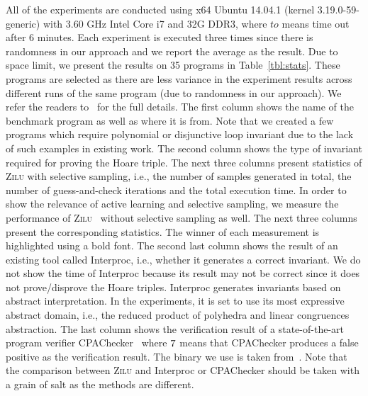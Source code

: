 All of the experiments are conducted using x64 Ubuntu 14.04.1 (kernel 3.19.0-59-generic) with 3.60 GHz Intel Core i7 and 32G DDR3, where $to$ means time out after 6 minutes. Each experiment is executed three times since there is randomness in our approach and we report the average as the result. Due to space limit, we present the results on 35 programs in Table~\ref{tbl:stats}. These programs are selected as there are less variance in the experiment results across different runs of the same program (due to randomness in our approach). We refer the readers to~\cite{zilu:repo} for the full details. The first column shows the name of the benchmark program as well as where it is from. Note that we created a few programs which require polynomial or disjunctive loop invariant due to the lack of such examples in existing work. The second column shows the type of invariant required for proving the Hoare triple. The next three columns present statistics of \textsc{Zilu} with selective sampling, i.e., the number of samples generated in total, the number of guess-and-check iterations and the total execution time. In order to show the relevance of active learning and selective sampling, we measure the performance of \textsc{Zilu}~\cite{zilu:repo} without selective sampling as well. The next three columns present the corresponding statistics. The winner of each measurement is highlighted using a bold font.
The second last column shows the result of an existing tool called Interproc, i.e., whether it generates a correct invariant. We do not show the time of Interproc because its result may not be correct since it does not prove/disprove the Hoare triples. Interproc generates invariants based on abstract interpretation. In the experiments, it is set to use its most expressive abstract domain, i.e., the reduced product of polyhedra and linear congruences abstraction.
The last column shows the verification result of a state-of-the-art program verifier CPAChecker~\cite{DBLP:conf/cav/BeyerK11} where $\ding{55}$ means that CPAChecker produces a false positive as the verification result. The binary we use is taken from~\cite{Dirk:SVCOMP:2016}. Note that the comparison between \textsc{Zilu} and Interproc or CPAChecker should be taken with a grain of salt as the methods are different.

